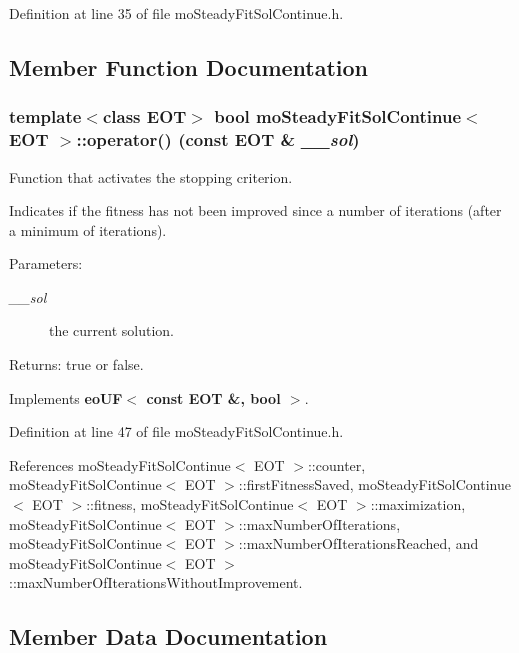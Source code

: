 Definition at line 35 of file moSteadyFitSolContinue.h.

\subsection{Member Function Documentation}
\subsubsection{\setlength{\rightskip}{0pt plus 5cm}template$<$class EOT$>$ bool {\bf moSteadyFitSolContinue}$<$ EOT $>$::operator() (const EOT \& {\em \_\-\_\-sol})\hspace{0.3cm}{\tt  [inline, virtual]}}\label{classmo_steady_fit_sol_continue_942e58ec00bb61000a83c80176e14bc3}


Function that activates the stopping criterion. 

Indicates if the fitness has not been improved since a number of iterations (after a minimum of iterations).

\begin{Desc}
\item[Parameters:]
\begin{description}
\item[{\em \_\-\_\-sol}]the current solution. \end{description}
\end{Desc}
\begin{Desc}
\item[Returns:]true or false. \end{Desc}


Implements {\bf eoUF$<$ const EOT \&, bool $>$}.

Definition at line 47 of file moSteadyFitSolContinue.h.

References moSteadyFitSolContinue$<$ EOT $>$::counter, moSteadyFitSolContinue$<$ EOT $>$::firstFitnessSaved, moSteadyFitSolContinue$<$ EOT $>$::fitness, moSteadyFitSolContinue$<$ EOT $>$::maximization, moSteadyFitSolContinue$<$ EOT $>$::maxNumberOfIterations, moSteadyFitSolContinue$<$ EOT $>$::maxNumberOfIterationsReached, and moSteadyFitSolContinue$<$ EOT $>$::maxNumberOfIterationsWithoutImprovement.

\subsection{Member Data Documentation}
